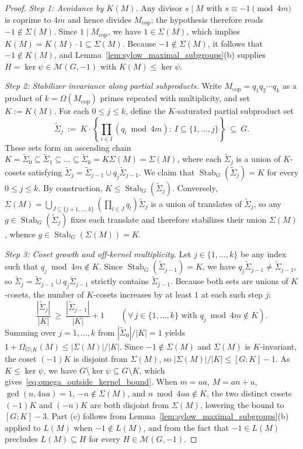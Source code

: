 \documentclass[11pt, a4paper]{article}
\theoremstyle{plain}
\theoremstyle{definition}
\begin{document}
\begin{proof}
\emph{Step 1: Avoidance by $K(M)$.} Any divisor $s\mid M$ with $s\equiv-1\pmod{4m}$ is coprime to $4m$ and hence divides $M_{\mathrm{cop}}$; the hypothesis therefore reads $-1\notin\Sigma(M)$. Since $1\mid M_{\mathrm{cop}}$, we have $1\in\Sigma(M)$, which implies $K(M)=K(M)\cdot 1\subseteq\Sigma(M)$. Because $-1\notin\Sigma(M)$, it follows that $-1\notin K(M)$, and Lemma~\ref{lem:sylow_maximal_subgroups}(b) supplies $H=\ker\psi\in\mathcal{M}(G,-1)$ with $K(M)\le\ker\psi$.

\medskip\noindent\emph{Step 2: Stabilizer invariance along partial subproducts.} Write $M_{\mathrm{cop}}=q_1 q_2\cdots q_k$ as a product of $k=\Omega(M_{\mathrm{cop}})$ primes repeated with multiplicity, and set $K:=K(M)$. For each $0\le j\le k$, define the $K$-saturated partial subproduct set
$$\widetilde{\Sigma}_j\ :=\ K\cdot\left\{\prod_{i\in I}(q_i\bmod 4m):\ I\subseteq\{1,\dots,j\}\right\}\ \subseteq\ G.$$
These sets form an ascending chain $K=\widetilde{\Sigma}_0\subseteq\widetilde{\Sigma}_1\subseteq\dots\subseteq\widetilde{\Sigma}_k=K\Sigma(M)=\Sigma(M)$, where each $\widetilde{\Sigma}_j$ is a union of $K$-cosets satisfying $\widetilde{\Sigma}_j=\widetilde{\Sigma}_{j-1}\cup q_j\widetilde{\Sigma}_{j-1}$. We claim that $\operatorname{Stab}_G(\widetilde{\Sigma}_j)=K$ for every $0\le j\le k$. By construction, $K\le\operatorname{Stab}_G(\widetilde{\Sigma}_j)$. Conversely, $\Sigma(M)=\bigcup_{J\subseteq\{j+1,\dots,k\}}(\prod_{l\in J}q_l)\widetilde{\Sigma}_j$ is a union of translates of $\widetilde{\Sigma}_j$, so any $g\in\operatorname{Stab}_G(\widetilde{\Sigma}_j)$ fixes each translate and therefore stabilizes their union $\Sigma(M)$, whence $g\in\operatorname{Stab}_G(\Sigma(M))=K$.

\medskip\noindent\emph{Step 3: Coset growth and off-kernel multiplicity.} Let $j\in\{1,\dots,k\}$ be any index such that $q_j\bmod 4m\notin K$. Since $\operatorname{Stab}_G(\widetilde{\Sigma}_{j-1})=K$, we have $q_j\widetilde{\Sigma}_{j-1}\neq\widetilde{\Sigma}_{j-1}$, so $\widetilde{\Sigma}_j=\widetilde{\Sigma}_{j-1}\cup q_j\widetilde{\Sigma}_{j-1}$ strictly contains $\widetilde{\Sigma}_{j-1}$. Because both sets are unions of $K$-cosets, the number of $K$-cosets increases by at least $1$ at each such step $j$:
$$\frac{|\widetilde{\Sigma}_j|}{|K|}\ \ge\ \frac{|\widetilde{\Sigma}_{j-1}|}{|K|}+1\qquad(\forall\,j\in\{1,\dots,k\}\text{ with }q_j\bmod 4m\notin K).$$
Summing over $j=1,\dots,k$ from $|\widetilde{\Sigma}_0|/|K|=1$ yields $1+\Omega_{G\setminus K}(M)\le|\Sigma(M)|/|K|$. Since $-1\notin\Sigma(M)$ and $\Sigma(M)$ is $K$-invariant, the coset $(-1)K$ is disjoint from $\Sigma(M)$, so $|\Sigma(M)|/|K|\le[G:K]-1$. As $K\le\ker\psi$, we have $G\setminus\ker\psi\subseteq G\setminus K$, which gives~\eqref{eq:omega_outside_kernel_bound}. When $m=ua$, $M=an+u$, $\gcd(n,4ua)=1$, $-n\notin\Sigma(M)$, and $n\bmod 4ua\notin K$, the two distinct cosets $(-1)K$ and $(-n)K$ are both disjoint from $\Sigma(M)$, lowering the bound to $[G:K]-3$. Part (c) follows from Lemma~\ref{lem:sylow_maximal_subgroups}(b) applied to $L(M)$ when $-1\notin L(M)$, and from the fact that $-1\in L(M)$ precludes $L(M)\subseteq H$ for every $H\in\mathcal{M}(G,-1)$.
\end{proof}
\end{document}
